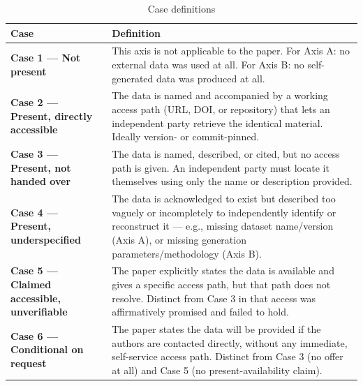 \begin{table}[htbp]
\centering
\caption{Case definitions}
\label{tab:cases}
\begin{tabular}{@{}>{\bfseries}p{2.6cm} p{10.5cm}@{}}
\toprule
Case & Definition \\
\midrule
Case 1 --- Not present &
This axis is not applicable to the paper. For Axis A: no external data was used at
all. For Axis B: no self-generated data was produced at all. \\
\addlinespace
Case 2 --- Present, directly accessible &
The data is named and accompanied by a working access path (URL, DOI, or repository)
that lets an independent party retrieve the identical material. Ideally version- or
commit-pinned. \\
\addlinespace
Case 3 --- Present, not handed over &
The data is named, described, or cited, but no access path is given. An independent
party must locate it themselves using only the name or description provided. \\
\addlinespace
Case 4 --- Present, underspecified &
The data is acknowledged to exist but described too vaguely or incompletely to
independently identify or reconstruct it --- e.g., missing dataset name/version (Axis
A), or missing generation parameters/methodology (Axis B). \\
\addlinespace
Case 5 --- Claimed accessible, unverifiable &
The paper explicitly states the data is available and gives a specific access path,
but that path does not resolve. Distinct from Case 3 in that access was affirmatively
promised and failed to hold. \\
\addlinespace
Case 6 --- Conditional on request &
The paper states the data will be provided if the authors are contacted directly,
without any immediate, self-service access path. Distinct from Case 3 (no offer at
all) and Case 5 (no present-availability claim). \\
\bottomrule
\end{tabular}
\end{table}
